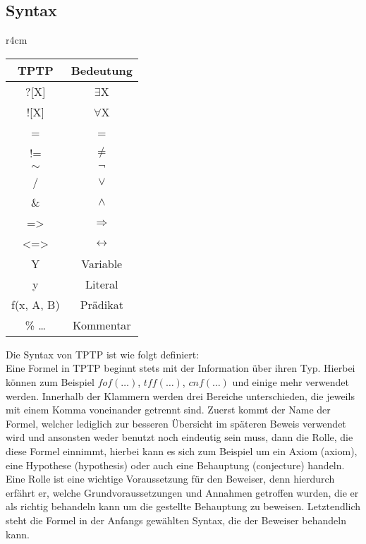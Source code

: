 \documentclass{article}
\begin{document}
\subsection{Syntax}
\label{subsec:syntax}


\begin{wraptable}{r}{4cm}
\begin{tabular}{|c|c|}
	\hline TPTP & Bedeutung \\ 
	\hline ?[X] & $\exists$X \\
	\hline ![X] & $\forall$X \\
	\hline = & = \\
	\hline != & $\neq$ \\
	\hline $\sim$ & $\lnot$ \\
	\hline / & $\lor$ \\
	\hline \& & $\land$ \\
	\hline => & $\Rightarrow$ \\
	\hline <=> & $\leftrightarrow$ \\
	\hline Y & Variable \\
	\hline y & Literal \\
	\hline f(x, A, B) & Prädikat \\
	\hline \% \dots & Kommentar \\
	\hline
\end{tabular} 
\end{wraptable}

Die Syntax von TPTP ist wie folgt definiert:\\
Eine Formel in TPTP beginnt stets mit der Information über ihren Typ. Hierbei können zum Beispiel $fof(\dots)$, $tff(\dots)$, $cnf(\dots)$ und einige mehr verwendet werden.
Innerhalb der Klammern werden drei Bereiche unterschieden, die jeweils mit einem Komma voneinander getrennt sind. 
Zuerst kommt der Name der Formel, welcher lediglich zur besseren Übersicht im späteren Beweis verwendet wird und ansonsten weder benutzt noch eindeutig sein muss,
dann die Rolle, die diese Formel einnimmt, hierbei kann es sich zum Beispiel um ein Axiom (axiom), eine Hypothese (hypothesis) oder auch eine Behauptung (conjecture) handeln.
Eine Rolle ist eine wichtige Voraussetzung für den Beweiser, denn hierdurch erfährt er, welche Grundvoraussetzungen und Annahmen getroffen wurden, die er als richtig behandeln kann um die gestellte Behauptung zu beweisen.
Letztendlich steht die Formel in der Anfangs gewählten Syntax, die der Beweiser behandeln kann.
\end{document}
